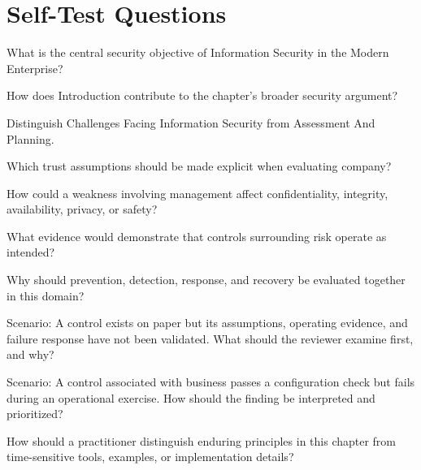 \documentclass[11pt,letterpaper]{article}
\begin{document}
\section*{Self-Test Questions}
\begin{CornellRecallList}
\item What is the central security objective of Information Security in the Modern Enterprise?
\item How does Introduction contribute to the chapter's broader security argument?
\item Distinguish Challenges Facing Information Security from Assessment And Planning.
\item Which trust assumptions should be made explicit when evaluating company?
\item How could a weakness involving management affect confidentiality, integrity, availability, privacy, or safety?
\item What evidence would demonstrate that controls surrounding risk operate as intended?
\item Why should prevention, detection, response, and recovery be evaluated together in this domain?
\item Scenario: A control exists on paper but its assumptions, operating evidence, and failure response have not been validated. What should the reviewer examine first, and why?
\item Scenario: A control associated with business passes a configuration check but fails during an operational exercise. How should the finding be interpreted and prioritized?
\item How should a practitioner distinguish enduring principles in this chapter from time-sensitive tools, examples, or implementation details?
\end{CornellRecallList}
\end{document}
